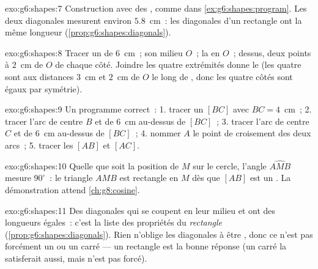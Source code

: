 \begin{solution}{exo:g6:shapes:7}
Construction avec des , comme dans
\cref{ex:g6:shapes:program}. Les deux diagonales mesurent environ
$5.8$~cm~: les diagonales d'un rectangle ont la même longueur
(\cref{prop:g6:shapes:diagonals}).
\end{solution}

\begin{solution}{exo:g6:shapes:8}
Tracer un  de $6$~cm~; son milieu $O$~; la  en
$O$~; dessus, deux points à $2$~cm de $O$ de chaque côté. Joindre
les quatre extrémités donne le  (les quatre  sont aux
distances $3$~cm et $2$~cm de $O$ le long de ,
donc les quatre côtés sont égaux par symétrie).
\end{solution}

\begin{solution}{exo:g6:shapes:9}
Un programme correct~:
1. tracer un  $[BC]$ avec $BC = 4$~cm~;
2. tracer l'arc de centre $B$ et de  $6$~cm au-dessus de
$[BC]$~;
3. tracer l'arc de centre $C$ et de  $6$~cm au-dessus de
$[BC]$~;
4. nommer $A$ le point de croisement des deux arcs~;
5. tracer les  $[AB]$ et $[AC]$.
\end{solution}

\begin{solution}{exo:g6:shapes:10}
Quelle que soit la position de $M$ sur le cercle, l'angle
$\widehat{AMB}$ mesure $90^\circ$~: le triangle $AMB$ est rectangle
en $M$ dès que $[AB]$ est un . La démonstration attend
\cref{ch:g8:cosine}.
\end{solution}

\begin{solution}{exo:g6:shapes:11}
Des diagonales qui se coupent en leur milieu et ont des longueurs
égales~: c'est la liste des propriétés du \emph{rectangle}
(\cref{prop:g6:shapes:diagonals}). Rien n'oblige les diagonales à
être , donc ce n'est pas forcément un  ou un
carré --- un rectangle est la bonne réponse (un carré la
satisferait aussi, mais n'est pas forcé).
\end{solution}

